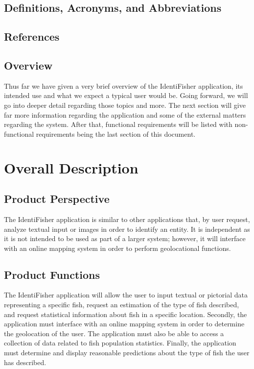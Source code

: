 \documentclass{article}
\begin{document}
\subsection{Definitions, Acronyms, and Abbreviations}

\iffalse
Anything can be added either by anyone on the team including myself, Chris.
\fi

\subsection{References}

\iffalse
Same goes for this, anything can be added as needed. I can cite if you wish.
\fi

\subsection{Overview}
Thus far we have given a very brief overview of the IdentiFisher application, its intended
use and what we expect a typical user would be. Going forward, we will go into deeper detail
regarding those topics and more. The next section will give far more information regarding
the application and some of the external matters regarding the system. After that, functional
requirements will be listed with non-functional requirements being the last section of this document.

\section{Overall Description}

\iffalse
This is still a rough draft of the overall desciption. If anyone would like to edit/add to this section, feel free.
\fi

\subsection{Product Perspective}

The IdentiFisher application is similar to other applications that, by user request, analyze textual input or images in order to identify an entity. It is independent as it is not intended to be used as part of a larger system; however, it will interface with an online mapping system in order to perform geolocational functions.  

\subsection{Product Functions}
The IdentiFisher application will allow the user to input textual or pictorial data representing a specific fish, request an estimation of the type of fish described, and request statistical information about fish in a specific location. Secondly, the application must interface with an online mapping system in order to determine the geolocation of the user. The application must also be able to access a collection of data related to fish population statistics. Finally, the application must determine and display reasonable predictions about the type of fish the user has described. 
\end{document}
